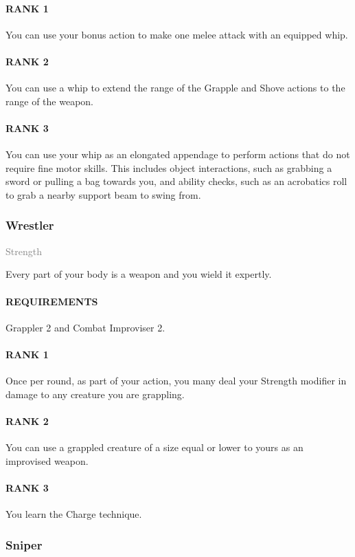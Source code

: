 \paragraph{RANK 1} You can use your bonus action to make one melee attack with an equipped whip.
\paragraph{RANK 2} You can use a whip to extend the range of the Grapple and Shove actions to the range of the weapon.
\paragraph{RANK 3} You can use your whip as an elongated appendage to perform actions that do not require fine motor skills.
This includes object interactions, such as grabbing a sword or pulling a bag towards you, and ability checks, such as an acrobatics roll to grab a nearby support beam to swing from.

\subsubsection{Wrestler} \label{feat::wrestler}
\small{\textcolor{gray}{Strength}}

\normalsize
Every part of your body is a weapon and you wield it expertly.
\paragraph{REQUIREMENTS} Grappler 2 and Combat Improviser 2.
\paragraph{RANK 1} Once per round, as part of your action, you many deal your Strength modifier in damage to any creature you are grappling.
\paragraph{RANK 2} You can use a grappled creature of a size equal or lower to yours as an improvised weapon.
\paragraph{RANK 3} You learn the Charge technique.

\subsubsection{Sniper} \label{feat::sniper}
